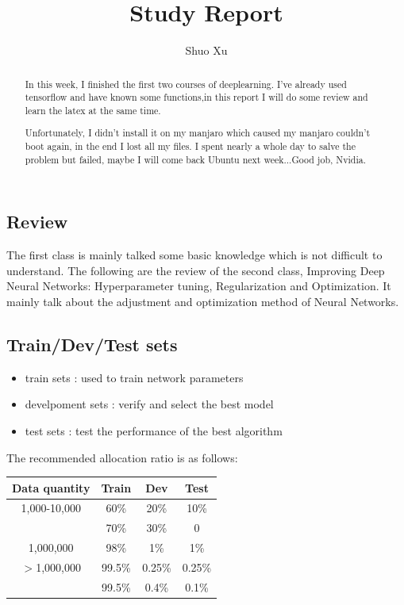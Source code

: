 \documentclass[10pt]{article}
\begin{document}
  \title{Study Report}
  \author{Shuo Xu}
  \maketitle
 \begin{abstract}
 
 In this week, I finished the first two courses of deeplearning. I've already used tensorflow and have known some functions,in this report I will do some review and learn the latex at the same time.

 Unfortunately, I didn't install it on my manjaro which caused my manjaro couldn't boot again, in the end I lost all my files. I spent nearly a whole day to salve the problem but failed, maybe I will come back Ubuntu next week...Good job, Nvidia.
 \end{abstract}
 \begin{center}
 \section{Review}
 \begin{flushleft}
 
 The first class is mainly talked some basic knowledge which is not difficult to understand. The following are the review of the second class, Improving Deep Neural Networks: Hyperparameter tuning, Regularization and Optimization. It mainly talk about the adjustment and optimization method of Neural Networks.
 \end{flushleft}
 \end{center}
 \subsection{Train/Dev/Test sets}
 \begin{itemize}
\item train sets : used to train network parameters
\item develpoment sets : verify and select the best model
\item test sets : test the performance of the best algorithm
\end{itemize}

  The recommended allocation ratio is as follows:\\

\begin{center}
\begin{tabular}{|c|c|c|c|}
\hline
\cline{1-2}
Data quantity   & Train   & Dev     &Test \\
\hline
1,000-10,000    & 60\%    & 20\%    &10\%  \\
                & 70\%    & 30\%    & 0   \\
\hline
1,000,000       & 98\%    & 1\%      & 1\%  \\
\hline
 $>$1,000,000   & 99.5\%  & 0.25\%   &0.25\%   \\
                & 99.5\%  & 0.4\%    &0.1\%   \\
\hline
\end{tabular}  
\end{center}
\end{document}
